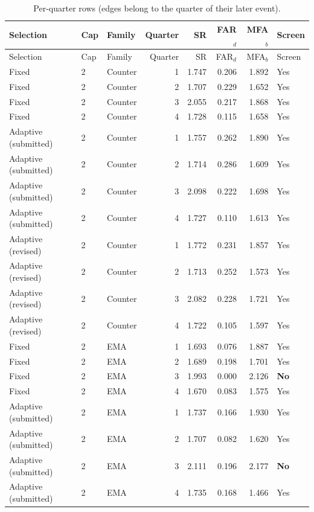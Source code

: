 {\footnotesize\setlength{\tabcolsep}{4pt}
\begin{longtable}{lllrrrrl}
\caption{Per-quarter rows (edges belong to the quarter of their later event).}\label{tab:s7_shift_q}\\
\toprule
Selection & Cap & Family & Quarter & SR & FAR$_d$ & MFA$_b$ & Screen\\
\midrule
\endfirsthead
\toprule
Selection & Cap & Family & Quarter & SR & FAR$_d$ & MFA$_b$ & Screen\\
\midrule
\endhead
\bottomrule
\endfoot
Fixed & 2 & Counter & 1 & 1.747 & 0.206 & 1.892 & Yes\\
Fixed & 2 & Counter & 2 & 1.707 & 0.229 & 1.652 & Yes\\
Fixed & 2 & Counter & 3 & 2.055 & 0.217 & 1.868 & Yes\\
Fixed & 2 & Counter & 4 & 1.728 & 0.115 & 1.658 & Yes\\
Adaptive (submitted) & 2 & Counter & 1 & 1.757 & 0.262 & 1.890 & Yes\\
Adaptive (submitted) & 2 & Counter & 2 & 1.714 & 0.286 & 1.609 & Yes\\
Adaptive (submitted) & 2 & Counter & 3 & 2.098 & 0.222 & 1.698 & Yes\\
Adaptive (submitted) & 2 & Counter & 4 & 1.727 & 0.110 & 1.613 & Yes\\
Adaptive (revised) & 2 & Counter & 1 & 1.772 & 0.231 & 1.857 & Yes\\
Adaptive (revised) & 2 & Counter & 2 & 1.713 & 0.252 & 1.573 & Yes\\
Adaptive (revised) & 2 & Counter & 3 & 2.082 & 0.228 & 1.721 & Yes\\
Adaptive (revised) & 2 & Counter & 4 & 1.722 & 0.105 & 1.597 & Yes\\
Fixed & 2 & EMA & 1 & 1.693 & 0.076 & 1.887 & Yes\\
Fixed & 2 & EMA & 2 & 1.689 & 0.198 & 1.701 & Yes\\
Fixed & 2 & EMA & 3 & 1.993 & 0.000 & 2.126 & \textbf{No}\\
Fixed & 2 & EMA & 4 & 1.670 & 0.083 & 1.575 & Yes\\
Adaptive (submitted) & 2 & EMA & 1 & 1.737 & 0.166 & 1.930 & Yes\\
Adaptive (submitted) & 2 & EMA & 2 & 1.707 & 0.082 & 1.620 & Yes\\
Adaptive (submitted) & 2 & EMA & 3 & 2.111 & 0.196 & 2.177 & \textbf{No}\\
Adaptive (submitted) & 2 & EMA & 4 & 1.735 & 0.168 & 1.466 & Yes\\

\end{longtable}}
